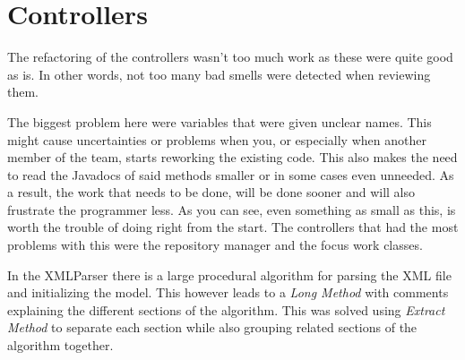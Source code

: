 



\maakvoorblad

\newpage
\thispagestyle{empty}
\mbox{}

\newpage
\maakvoorblad

\newpage

\tableofcontents

\newpage

\section{Controllers}
The refactoring of the controllers wasn't too much work as these were quite good as is. In other words, not too many bad smells were detected when reviewing them.

The biggest problem here were variables that were given unclear names. This might cause uncertainties or problems when you, or especially when another member of the team, starts reworking the existing code. This also makes the need to read the Javadocs of said methods smaller or in some cases even unneeded. As a result, the work that needs to be done, will be done sooner and will also frustrate the programmer less. As you can see, even something as small as this, is worth the trouble of doing right from the start. 
The controllers that had the most problems with this were the repository manager and the focus work classes.

In the XMLParser there is a large procedural algorithm for parsing the XML file and initializing the model. This however leads to a \emph{Long Method} with comments explaining the different sections of the algorithm. This was solved using \emph{Extract Method} to separate each section while also grouping related sections of the algorithm together.

